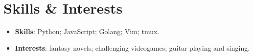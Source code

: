\documentclass[letterpaper,11pt]{article}
\newcommand{\resumeItem}[2]{
  \item\small{
    \textbf{#1}{: #2 \vspace{-2pt}}
  }
}
\newcommand{\resumeSubItem}[2]{\resumeItem{#1}{#2}\vspace{-4pt}}
\newcommand{\resumeSubHeadingListStart}{\begin{itemize}[leftmargin=*]}
\newcommand{\resumeSubHeadingListEnd}{\end{itemize}}
\begin{document}
\section{Skills \& Interests}
  \resumeSubHeadingListStart
    \resumeSubItem{Skills}{Python; JavaScript; Golang; Vim; tmux.}
    \resumeSubItem{Interests}{fantasy novels; challenging videogames; guitar
    playing and singing.}
  \resumeSubHeadingListEnd

\end{document}
